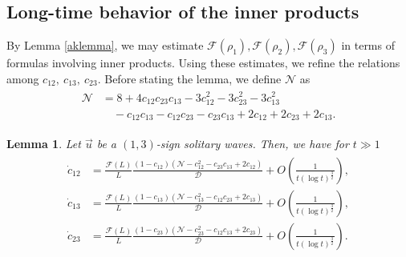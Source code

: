 \documentclass[reqno]{amsart}
\theoremstyle{plain}
\newtheorem{lemma}[theorem]{Lemma}
\theoremstyle{definition}
\numberwithin{equation}{section}
\newcommand{\1}{\mathbbm{1}}
\begin{document}
\subsection{Long-time behavior of the inner products}
By Lemma \ref{aklemma}, we may estimate $\mathcal{F}(\rho_1),\mathcal{F}(\rho_2),\mathcal{F}(\rho_3)$ in terms of formulas involving inner products.
Using these estimates, we refine the relations among $c_{12},\ c_{13},\ c_{23}$.
Before stating the lemma, we define $\mathcal{N}$ as
\begin{align}\label{Ndef}
\begin{aligned}
\mathcal{N}&=8+4c_{12}c_{23}c_{13}-3c_{12}^2-3c_{23}^2-3c_{13}^2
\\
&\quad-c_{12}c_{13}-c_{12}c_{23}-c_{23}c_{13}+2c_{12}+2c_{23}+2c_{13}.
\end{aligned}
\end{align}
\begin{lemma}\label{naisekiyokusuru}
Let $\vec{u}$ be a $(1,3)$-sign solitary waves. Then, we have for $t\gg 1$
\begin{align}\label{codenew}
\begin{aligned}
\dot{c}_{12}&=\frac{\mathcal{F}(L)}{L}\frac{(1-c_{12})(\mathcal{N}-c_{12}^2-c_{23}c_{13}+2c_{12})}{\mathcal{D}}+O\left(\frac{1}{t(\log{t})^{\frac{3}{2}}}\right),
\\
\dot{c}_{13}&=\frac{\mathcal{F}(L)}{L}\frac{(1-c_{13})(\mathcal{N}-c_{13}^2-c_{12}c_{23}+2c_{13})}{\mathcal{D}}+O\left(\frac{1}{t(\log{t})^{\frac{3}{2}}}\right),
\\
\dot{c}_{23}&=\frac{\mathcal{F}(L)}{L}\frac{(1-c_{23})(\mathcal{N}-c_{23}^2-c_{12}c_{13}+2c_{23})}{\mathcal{D}}+O\left(\frac{1}{t(\log{t})^{\frac{3}{2}}}\right).
\end{aligned}
\end{align}
\end{lemma}
\end{document}
